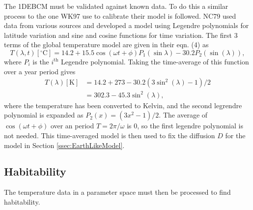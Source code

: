 \documentclass[12pt, onecolumn]{revtex4-2}    %
\newcommand{\degrees}{\ensuremath{^{\circ}}}
\begin{document}
The 1DEBCM must be validated against known data.
To do this a similar process to the one WK97 use to calibrate their model is followed.
NC79 used data from various sources and developed a model using Legendre polynomials for latitude variation and sine and cosine functions for time variation.
The first 3 terms of the global temperature model are given in their eqn. (4) as
\begin{equation}
  T(\lambda, t)[\degrees\text{C}] = 14.2 + 15.5 \cos(\omega t + \phi) P_1(\sin\lambda) - 30.2 P_2(\sin(\lambda)), \label{eq:NC_timedep}
\end{equation}
where $P_i$ is the $i^\text{th}$ Legendre polynomial.
Taking the time-average of this function over a year period gives
\begin{equation}
  \begin{split}
    T(\lambda)[\text{K}] & = 14.2 + 273 - 30.2 (3 \sin^2(\lambda) - 1) / 2 \\
                         & = 302.3 - 45.3\sin^2(\lambda),
  \end{split}
  \label{eq:NC_timeavg}
\end{equation}
where the temperature has been converted to Kelvin, and the second legrendre polynomial is expanded as $P_2(x) =(3x^2-1) / 2$.
The average of $\cos(\omega t + \phi)$ over an period $T = 2\pi / \omega$ is $0$, so the first legendre polynomial is not needed.
This time-averaged model is then used to fix the diffusion $D$ for the model in Section \ref{ssec:EarthLikeModel}.



\subsection{Habitability}
The temperature data in a parameter space must then be processed to find habitability.
\end{document}
